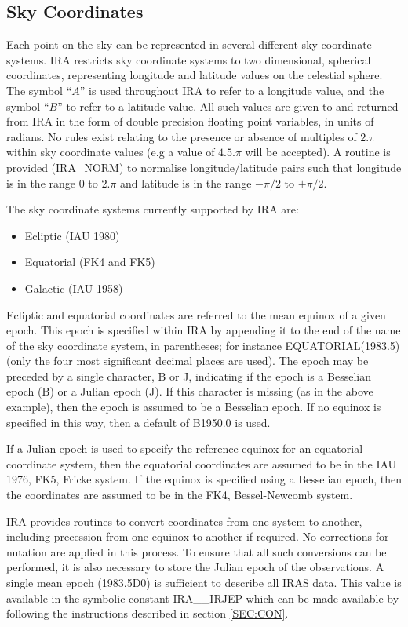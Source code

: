 \subsection {Sky Coordinates}
\label {SEC:SCS}
Each point on the sky can be represented in several different sky coordinate
systems. IRA restricts sky coordinate systems to two dimensional, spherical
coordinates, representing longitude and latitude values on the celestial sphere.
The symbol ``$A$'' is used throughout IRA to refer to a longitude value, and the
symbol ``$B$'' to refer to a latitude value. All such values are given to and
returned from IRA in the form of double precision floating point variables, in
units of radians. No rules exist relating to the presence or absence of
multiples of $2.\pi$ within sky coordinate values (e.g a value of $4.5.\pi$ will
be accepted). A routine is provided (IRA\_NORM) to normalise longitude/latitude
pairs such that longitude is in the range $0$ to $2.\pi$ and latitude is in the
range $-\pi/2$ to $+\pi/2$. 

The sky coordinate systems currently supported by IRA are:
\begin {itemize}
\item Ecliptic (IAU 1980)
\item Equatorial (FK4 and FK5)
\item Galactic (IAU 1958)
\end{itemize}

Ecliptic and equatorial coordinates are referred to the mean equinox of a given
epoch. This epoch is specified within IRA by appending it to the end of the name
of the sky coordinate system, in parentheses; for instance EQUATORIAL(1983.5)
(only the four most significant decimal places are used). The epoch may be
preceded by a single character, B or J, indicating if the epoch is a Besselian
epoch (B) or a Julian epoch (J). If this character is missing (as in the above
example), then the epoch is assumed to be a Besselian epoch. If no equinox is
specified in this way, then a default of B1950.0 is used. 

If a Julian epoch is used to specify the reference equinox for an equatorial 
coordinate system, then the equatorial coordinates are assumed to be in the 
IAU 1976, FK5, Fricke system. If the equinox is specified using a Besselian 
epoch, then the coordinates are assumed to be in the FK4, Bessel-Newcomb system.

IRA provides routines to convert coordinates from one system to another,
including precession from one equinox to another if required. No corrections for
nutation are applied in this process. To ensure that all such conversions can be
performed, it is also necessary to store the Julian epoch of the observations. A
single mean epoch (1983.5D0) is sufficient to describe all IRAS data. This value
is available in the symbolic constant IRA\_\_IRJEP which can be made available
by following the instructions described in section \ref {SEC:CON}.

